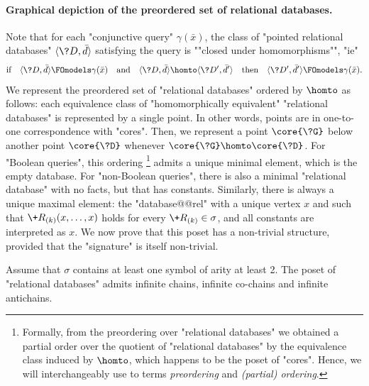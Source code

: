 \paragraph*{Graphical depiction of the preordered set of relational databases.}
Note that for each "conjunctive query" $\gamma(\bar x)$, the class of
"pointed relational databases" $\tup{\?D, \bar d}$ satisfying the query
is \AP""closed under homomorphisms"", "ie"
\[
	\text{if}\quad \tup{\?D, \bar d} \FOmodels \gamma(\bar x)
	\quad\text{and}\quad \tup{\?D, \bar d} \homto \tup{\?D', \bar d'}
	\quad\text{then}\quad \tup{\?D', \bar d'} \FOmodels \gamma(\bar x).
\]
We represent the preordered set of "relational databases" ordered by $\homto$ as follows:
each equivalence class of "homomorphically equivalent" "relational databases" is
represented by a single point. In other words, points are in one-to-one correspondence
with "cores". Then, we represent a point $\core{\?G}$ below another point $\core{\?D}$
whenever $\core{\?G} \homto \core{\?D}$.
For "Boolean queries", this ordering%
\footnote[][-5cm]{Formally, from the preordering over "relational databases" we obtained a partial
order over the quotient of "relational databases" by the equivalence class induced by $\homto$,
which happens to be the poset of "cores". Hence, we will interchangeably
use to terms \emph{preordering} and \emph{(partial) ordering}.}
admits a unique minimal element, which is the empty database.
For "non-Boolean queries", there is also a minimal "relational database" with
no facts, but that has constants.
Similarly, there is always a unique maximal element: the "database@@rel" with
a unique vertex $x$ and such that $\+R_{(k)}(x,\dotsc,x)$ holds for
every $\+R_{(k)} \in \sigma$, and all constants are interpreted as $x$.
We now prove that this poset has a non-trivial structure, provided that the "signature"
is itself non-trivial.

\begin{proposition}
	\AP\label{prop:poset-reldb}
	Assume that $\sigma$ contains at least one symbol of arity at least 2.
	The poset of "relational databases"
	admits infinite chains, infinite co-chains and infinite antichains.
\end{proposition}

